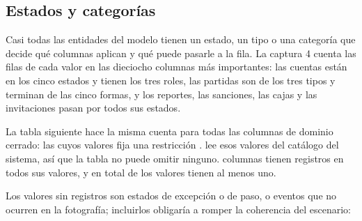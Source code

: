 \subsection*{Estados y categorías}

Casi todas las entidades del modelo tienen un estado, un tipo o una categoría que decide qué columnas aplican y qué puede pasarle a la fila. La captura 4 cuenta las filas de cada valor en las dieciocho columnas más importantes: las cuentas están en los cinco estados y tienen los tres roles, las partidas son de los tres tipos y terminan de las cinco formas, y los reportes, las sanciones, las cajas y las invitaciones pasan por todos sus estados.


La tabla siguiente hace la misma cuenta para todas las columnas de dominio cerrado: las \dnNumDominios{} cuyos valores fija una restricción .  lee esos valores del catálogo del sistema, así que la tabla no puede omitir ninguno. \dnNumDominiosCompletos{} columnas tienen registros en todos sus valores, y en total \dnNumValoresConFilas{} de los \dnNumValores{} valores tienen al menos uno.



Los valores sin registros son estados de excepción o de paso, o eventos que no ocurren en la fotografía; incluirlos obligaría a romper la coherencia del escenario:

